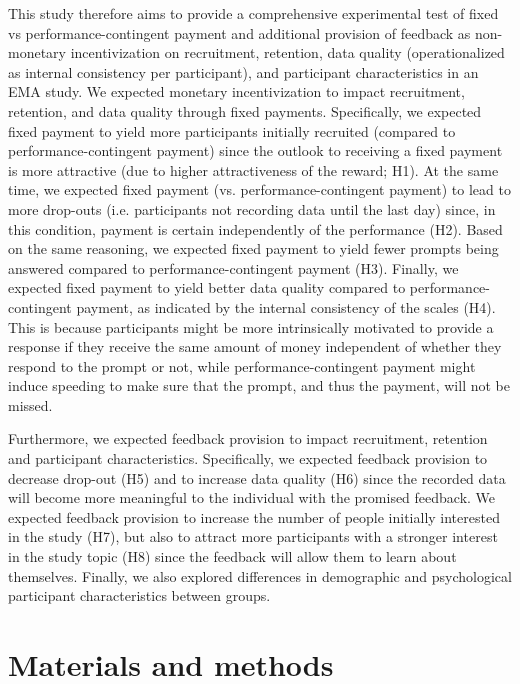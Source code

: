 \documentclass[authordate, empirical,issue]{jote-new-article}
\begin{document}
This study therefore aims to provide a comprehensive experimental test of fixed vs performance-contingent payment and additional provision of feedback as non-monetary incentivization on recruitment, retention, data quality (operationalized as internal consistency per participant), and participant characteristics in an EMA study. We expected monetary incentivization to impact recruitment, retention, and data quality through fixed payments. Specifically, we expected fixed payment to yield more participants initially recruited (compared to performance-contingent payment) since the outlook to receiving a fixed payment is more attractive (due to higher attractiveness of the reward; H1). At the same time, we expected fixed payment (vs. performance-contingent payment) to lead to more drop-outs (i.e. participants not recording data until the last day) since, in this condition, payment is certain independently of the performance (H2). Based on the same reasoning, we expected fixed payment to yield fewer prompts being answered compared to performance-contingent payment (H3). Finally, we expected fixed payment to yield better data quality compared to performance-contingent payment, as indicated by the internal consistency of the scales (H4). This is because participants might be more intrinsically motivated to provide a response if they receive the same amount of money independent of whether they respond to the prompt or not, while performance-contingent payment might induce speeding to make sure that the prompt, and thus the payment, will not be missed.



Furthermore, we expected feedback provision to impact recruitment, retention and participant characteristics. Specifically, we expected feedback provision to decrease drop-out (H5) and to increase data quality (H6) since the recorded data will become more meaningful to the individual with the promised feedback. We expected feedback provision to increase the number of people initially interested in the study (H7), but also to attract more participants with a stronger interest in the study topic (H8) since the feedback will allow them to learn about themselves. Finally, we also explored differences in demographic and psychological participant characteristics between groups.



\section{Materials and methods}
\end{document}
